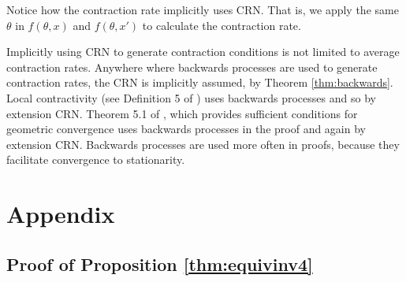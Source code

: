 \documentclass[12pt]{article}
\theoremstyle{plain}%
\theoremstyle{definition}
\begin{document}
	Notice how the contraction rate implicitly uses CRN. That is, we apply the same $\theta$ in $f(\theta,x)$ and $f(\theta,x')$ to calculate the contraction rate.
	
	Implicitly using CRN to generate contraction conditions is not limited to average contraction rates. Anywhere where backwards processes are used to generate contraction rates, the CRN is implicitly assumed, by Theorem \ref{thm:backwards}. Local contractivity (see Definition 5 of \cite{localcont}) uses backwards processes and so by extension CRN. Theorem 5.1 of \cite{iteratedranfunc}, which provides sufficient conditions for geometric convergence uses backwards processes in the proof and again by extension CRN. Backwards processes are used more often in proofs, because they facilitate convergence to stationarity.
	
	\section{Appendix}
	\subsection{Proof of Proposition \ref{thm:equivinv4}}\label{sec:skorohod}
	
\end{document}
